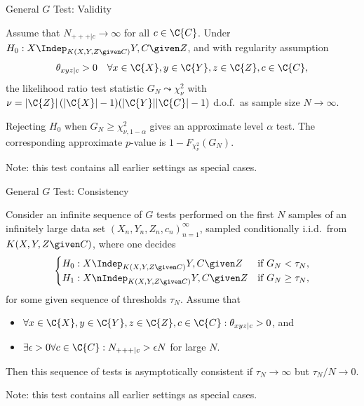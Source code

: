 \begin{frame}{General $G$ Test: Validity}
\begin{Prp}
  Assume that $N_{+++|c} \to \infty$ for all $c \in \C{C}$.
  Under $H_0 : X \Indep_{K(X,Y,Z \given C)} Y,C \given Z$, and with regularity assumption
  $$\theta_{xyz|c} > 0 \quad\forall x \in \C{X}, y \in \C{Y}, z \in \C{Z}, c \in \C{C},$$
  the likelihood ratio test statistic $G_N \leadsto \chi^2_\nu$ 
  with $\nu = |\C{Z}|\,(|\C{X}| - 1)(|\C{Y}||\C{C}| - 1)$ d.o.f.\ as sample size $N \to \infty$.
\end{Prp}
\begin{Cor}
  Rejecting $H_0$ when $G_N \ge \chi_{\nu,1-\alpha}^2$ gives an approximate level $\alpha$ test.
  The corresponding approximate $p$-value is $1-F_{\chi^2_\nu}(G_N)$.
\end{Cor}
Note: this test contains all earlier settings as special cases.
\end{frame}

\begin{frame}{General $G$ Test: Consistency}
\begin{Cor}
Consider an infinite sequence of $G$ tests performed on the first $N$ samples of an infinitely large
data set $(X_n,Y_n,Z_n,c_n)_{n=1}^\infty$, sampled conditionally i.i.d.\ from $K(X,Y,Z \given C)$,
where one decides
  $$\begin{cases}
    H_0 : X \Indep_{K(X,Y,Z \given C)} Y,C \given Z     & \text{if $G_N < \tau_N$},\\
    H_1 : X \nIndep_{K(X,Y,Z \given C)} Y,C \given Z & \text{if $G_N \ge \tau_N$,}
  \end{cases}$$
for some given sequence of thresholds $\tau_N$.
Assume that 
  \begin{itemize}
    \item $\forall x \in \C{X}, y \in \C{Y}, z \in \C{Z}, c \in \C{C} : \theta_{xyz|c} > 0$, and
    \item $\exists \epsilon > 0 \forall c \in \C{C} : N_{+++|c}  > \epsilon N$ for large $N$.
  \end{itemize}
Then this sequence of tests is asymptotically consistent if $\tau_N \to \infty$ but $\tau_N / N \to 0$.
\end{Cor}
Note: this test contains all earlier settings as special cases.
\end{frame}
